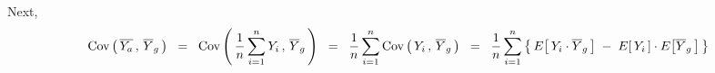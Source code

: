 Next,
\begin{equation*}
\textnormal{Cov}\left(\,\overline{Y_{a}}\,,\,\overline{Y}_{g}\,\right)
\;\;=\;\;
\textnormal{Cov}\left(\,
\dfrac{1}{n}\sum_{i=1}^{n}Y_{i}
\,,\,
\overline{Y}_{g}
\,\right)
\;\;=\;\;
\dfrac{1}{n}\sum_{i=1}^{n}
\textnormal{Cov}\left(\,
Y_{i}
\,,\,
\overline{Y}_{g} %
\,\right)
\;\;=\;\;
\dfrac{1}{n}\sum_{i=1}^{n}
\left\{\,
E\!\left[\,Y_{i}\cdot \overline{Y}_{g}\,\right]
\;-\;
E\!\left[\,Y_{i}\,\right]\cdot E\!\left[\overline{Y}_{g}\,\right]
\,\right\}
\end{equation*}


